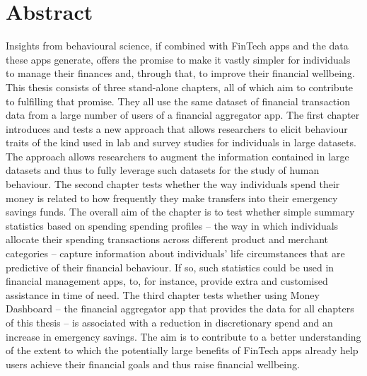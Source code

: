 
\chapter*{Abstract}%
\label{cha:abstract}

Insights from behavioural science, if combined with FinTech apps and the data
these apps generate, offers the promise to make it vastly simpler for
individuals to manage their finances and, through that, to improve their
financial wellbeing. This thesis consists of three stand-alone chapters, all of
which aim to contribute to fulfilling that promise. They all use the same
dataset of financial transaction data from a large number of users of a
financial aggregator app. The first chapter introduces and tests a new approach
that allows researchers to elicit behaviour traits of the kind used in lab and
survey studies for individuals in large datasets. The approach allows
researchers to augment the information contained in large datasets and thus to
fully leverage such datasets for the study of human behaviour. The second
chapter tests whether the way individuals spend their money is related to how
frequently they make transfers into their emergency savings funds. The overall
aim of the chapter is to test whether simple summary statistics based on
spending spending profiles -- the way in which individuals allocate their
spending transactions across different product and merchant categories --
capture information about individuals' life circumstances that are predictive
of their financial behaviour. If so, such statistics could be used in financial
management apps, to, for instance, provide extra and customised assistance in
time of need. The third chapter tests whether using Money Dashboard -- the
financial aggregator app that provides the data for all chapters of this thesis
-- is associated with a reduction in discretionary spend and an increase in
emergency savings. The aim is to contribute to a better understanding of the
extent to which the potentially large benefits of FinTech apps already help
users achieve their financial goals and thus raise financial wellbeing.


